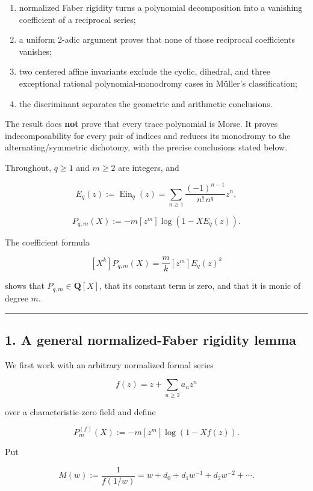 \documentclass[11pt]{article}
\theoremstyle{keio}
\theoremstyle{definition}
\theoremstyle{remark}
\providecommand{\tightlist}{\setlength{\itemsep}{0pt}\setlength{\parskip}{0pt}}
\begin{document}
\begin{enumerate}
\def\labelenumi{\arabic{enumi}.}
\tightlist
\item
  normalized Faber rigidity turns a polynomial decomposition into a
  vanishing coefficient of a reciprocal series;
\item
  a uniform 2-adic argument proves that none of those reciprocal
  coefficients vanishes;
\item
  two centered affine invariants exclude the cyclic, dihedral, and three
  exceptional rational polynomial-monodromy cases in Müller's
  classification;
\item
  the discriminant separates the geometric and arithmetic conclusions.
\end{enumerate}

The result does \textbf{not} prove that every trace polynomial is Morse. It proves
indecomposability for every pair of indices and reduces its monodromy to the
alternating/symmetric dichotomy, with the precise conclusions stated below.

Throughout, \(q\geq1\) and \(m\geq2\) are integers, and

\[
 E_q(z):=\operatorname {Ein}_q(z)
 =\sum_{n\geq1}\frac{(-1)^{n-1}}{n!\,n^q}z^n,
\]

\[
 P_{q,m}(X):=-m[z^m]\log(1-XE_q(z)).
\]

The coefficient formula

\[
 [X^k]P_{q,m}(X)=\frac{m}{k}[z^m]E_q(z)^k
\]

shows that \(P_{q,m}\in\mathbf Q[X]\), that its constant term is zero, and
that it is monic of degree \(m\).

\begin{center}\rule{0.5\linewidth}{0.5pt}\end{center}

\subsection{1. A general normalized-Faber rigidity lemma}

We first work with an arbitrary normalized formal series

\[
 f(z)=z+\sum_{n\geq2}a_nz^n
\]

over a characteristic-zero field and define

\[
 P_m^{(f)}(X):=-m[z^m]\log(1-Xf(z)).
\]

Put

\[
 M(w):=\frac1{f(1/w)}
 =w+d_0+d_1w^{-1}+d_2w^{-2}+\cdots .
\]
\end{document}
